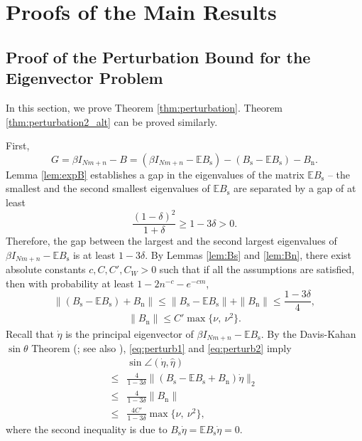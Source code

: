 \documentclass[11pt,journal]{IEEEtran}
\newcommand{\bbE}{\mathbb{E}}
\newcommand{\rms}{\mathrm{s}}
\newcommand{\rmn}{\mathrm{n}}
\newcommand{\norm}[1]{\|{#1}\|}
\begin{document}
\section{Proofs of the Main Results} \label{sec:proof}

\subsection{Proof of the Perturbation Bound for the Eigenvector Problem}

In this section, we prove Theorem \ref{thm:perturbation}. Theorem \ref{thm:perturbation2_alt} can be proved similarly.

\begin{IEEEproof}
First, 
\begin{equation}
\label{eq:Gsum}
G = \beta I_{Nm+n} - B = (\beta I_{Nm+n} - \bbE B_\rms) - (B_\rms - \bbE B_\rms) - B_\rmn. 
\end{equation}
Lemma \ref{lem:expB} establishes a gap in the eigenvalues of the matrix $\bbE B_\rms$ -- the smallest and the second smallest eigenvalues of $\bbE B_\rms$ are separated by a gap of at least
\[
\frac{(1-\delta)^2}{1+\delta} \geq 1 - 3\delta > 0.
\]
Therefore, the gap between the largest and the second largest eigenvalues of $\beta I_{Nm+n} - \bbE B_\rms$ is at least $1-3\delta$. By Lemmas \ref{lem:Bs} and \ref{lem:Bn}, there exist absolute constants $c,C,C', C_W > 0$ such that if all the assumptions are satisfied, then with probability at least $1-2n^{-c} - e^{-cm}$,
\begin{equation}
\label{eq:perturb1}
\norm{(B_\rms - \bbE B_\rms) + B_\rmn} \leq \norm{B_\rms - \bbE B_\rms} + \norm{B_\rmn} \leq \frac{1-3\delta}{4},
\end{equation}
\begin{align}
\norm{B_\rmn} \leq C' \max \{\nu,~\nu^2 \}. \label{eq:perturb2}
\end{align}
Recall that $\dot{\eta}$ is the principal eigenvector of $\beta I_{Nm+n} - \bbE B_\rms$. By the Davis-Kahan $\sin\theta$ Theorem (\cite{Davis1970}; see also \cite[Theorem 8.1.12]{Golub1996}), \eqref{eq:perturb1} and \eqref{eq:perturb2} imply
\begin{align*}
& \sin\angle(\dot{\eta}, \hat{\eta}) \\
\leq & \frac{4}{1-3\delta} \norm{ (B_\rms - \bbE B_\rms + B_\rmn) \dot{\eta} }_2 \\
\leq & \frac{4}{1-3\delta} \norm{B_\rmn} \\
\leq & \frac{4C'}{1-3\delta} \max \{\nu,~\nu^2 \},
\end{align*}
where the second inequality is due to $B_\rms \dot{\eta} = \bbE B_\rms \dot{\eta} = 0$.


\end{IEEEproof}
\end{document}

